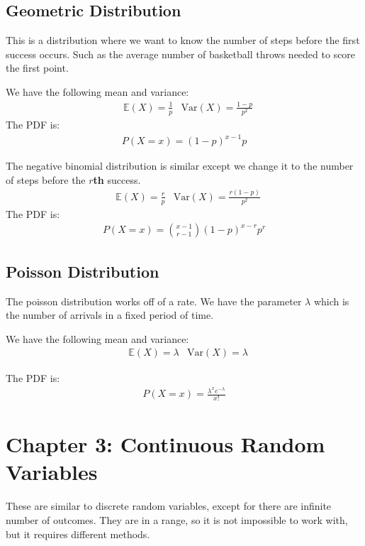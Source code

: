 \documentclass[12pt,letterpaper]{article} \usepackage{amsmath} \usepackage{graphicx} \usepackage[margin=1in]{geometry} \usepackage{longtable}  \usepackage{amssymb}
\begin{document}
	\subsection{Geometric Distribution}
	This is a distribution where we want to know the number of steps before the first success occurs. Such as the average number of basketball throws needed to score the first point. 
	
	We have the following mean and variance:
	\begin{align*}
		&\mathbb E(X) = \frac{1}{p} &\text{Var}(X) = \frac{1-p}{p^2}
	\end{align*}
	The PDF is:
	\begin{align*}
		P(X=x)=(1-p)^{x-1}p
	\end{align*}

	The negative binomial distribution is similar except we change it to the number of steps before the \textbf{$r$th} success. 
	\begin{align*}
		&\mathbb E(X) = \frac{r}{p} &\text{Var}(X) = \frac{r(1-p) }{p^2}
	\end{align*}
	The PDF is:
	\begin{align*}
		P(X=x)= \binom{x-1}{r-1} (1-p)^{x-r}p^r
	\end{align*}

	\subsection{Poisson Distribution}
	The poisson distribution works off of a rate. We have the parameter $\lambda$ which is the number of arrivals in a fixed period of time. 
	
	We have the following mean and variance:
	\begin{align*}
		&\mathbb E(X) =\lambda &\text{Var}(X) = \lambda
	\end{align*}

	The PDF is:
	\begin{align*}
		P(X=x) = \frac{\lambda^xe^{-\lambda}}{x!}
	\end{align*}
	
	\section{Chapter 3: Continuous Random Variables}
	These are similar to discrete random variables, except for there are infinite number of outcomes. They are in a range, so it is not impossible to work with, but it requires different methods.
	
\end{document}
